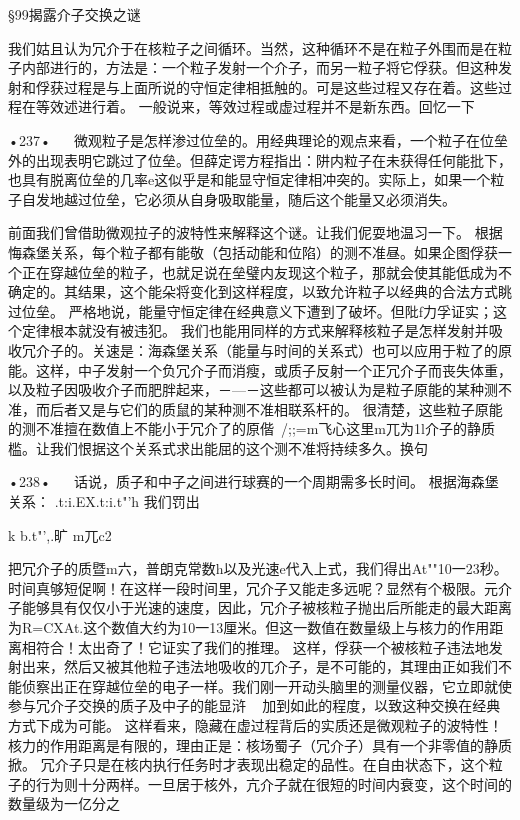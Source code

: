 §99揭露介子交换之谜

我们姑且认为冗介于在核粒子之间循环。当然，这种循环不是在粒子外围而是在粒子内部进行的，方法是：一个粒子发射一个介子，而另一粒子将它俘获。但这种发射和俘获过程是与上面所说的守恒定律相抵触的。可是这些过程又存在着。这些过程在等效述进行着。
一般说来，等效过程或虚过程并不是新东西。回忆一下

•237•
  
微观粒子是怎样渗过位垒的。用经典理论的观点来看，一个粒子在位垒外的出现表明它跳过了位垒。但薛定谔方程指出：阱内粒子在未获得任何能批下，也具有脱离位垒的几率e这似乎是和能显守恒定律相冲突的。实际上，如果一个粒子自发地越过位垒，它必须从自身吸取能量，随后这个能量又必须消失。

前面我们曾借助微观拉子的波特性来解释这个谜。让我们伲耍地温习一下。
根据悔森堡关系，每个粒子都有能敬（包括动能和位陷）的测不准昼。如果企图俘获一个正在穿越位垒的粒子，也就足说在垒璧内友现这个粒子，那就会使其能低成为不确定的。其结果，这个能朵将变化到这样程度，以致允许粒子以经典的合法方式眺过位垒。
严格地说，能量守恒定律在经典意义下遭到了破坏。但阰f力孚证实；这个定律根本就没有被违犯。
我们也能用同样的方式来解释核粒子是怎样发射并吸收冗介子的。关速是：海森堡关系（能量与时间的关系式）也可以应用于粒了的原能。这样，中子发射一个负冗介子而消瘦，或质子反射一个正冗介子而丧失体重，以及粒子因吸收介子而肥胖起来，－—－这些都可以被认为是粒子原能的某种测不准，而后者又是与它们的质鼠的某种测不准相联系杆的。
很清楚，这些粒子原能的测不准擅在数值上不能小于冗介了的原偕~/;;=m飞心这里m兀为1l介子的静质槛。让我们恨据这个关系式求出能屈的这个测不准将持续多久。换句

•238•
  
话说，质子和中子之间进行球赛的一个周期需多长时间。
根据海森堡关系：
.t:i.EX.t:i.t"'h
我们罚出

k
b.t"',.旷
m兀c2

把冗介子的质暨m六，普朗克常数h以及光速e代入上式，我们得出At""10一23秒。
时间真够短促啊！在这样一段时间里，冗介子又能走多远呢？显然有个极限。元介子能够具有仅仅小于光速的速度，因此，冗介子被核粒子抛出后所能走的最大距离为R=CXAt.这个数值大约为10一13厘米。但这一数值在数量级上与核力的作用距离相符合！太出奇了！它证实了我们的推理。
这样，俘获一个被核粒子违法地发射出来，然后又被其他粒子违法地吸收的兀介子，是不可能的，其理由正如我们不能侦察出正在穿越位垒的电子一样。我们刚一开动头脑里的测量仪器，它立即就使参与冗介子交换的质子及中子的能显浒
~
加到如此的程度，以致这种交换在经典方式下成为可能。
这样看来，隐藏在虚过程背后的实质还是微观粒子的波特性！核力的作用距离是有限的，理由正是：核场蜀子（冗介子）具有一个非零值的静质掀。
冗介子只是在核内执行任务时才表现出稳定的品性。在自由状态下，这个粒子的行为则十分两样。一旦居于核外，亢介子就在很短的时间内衰变，这个时间的数量级为一亿分之

